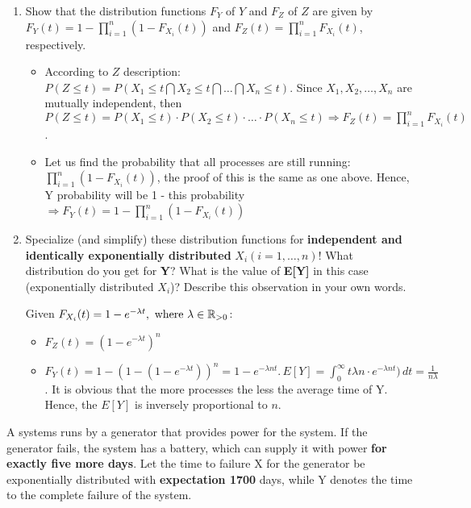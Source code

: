 \documentclass{homework}
\begin{document}
\begin{enumerate}[label=(\alph*)]
	\item Show that the distribution functions $F_Y$ of $Y$ and $F_Z$ of $Z$ are given by \newline $F_Y(t) = 1 - \prod_{i=1}^{n} (1 - F_{X_i}(t))$ and $F_Z(t) = \prod_{i=1}^{n} F_{X_i}(t)$, respectively.
	\begin{itemize}
		\item According to $Z$ description: $P(Z\leq t) = P(X_1\leq t \bigcap X_2\leq t \bigcap \dots \bigcap X_n\leq t)$. Since $X_1, X_2,\dots,X_n$ are mutually independent, then \newline $P(Z\leq t) = P(X_1\leq t)\cdot P(X_2\leq t) \cdot \dots \cdot P(X_n\leq t) \Rightarrow F_Z(t) = \prod_{i=1}^{n} F_{X_i}(t)$.
		\item Let us find the probability that all processes are still running: $\prod_{i=1}^{n} (1 - F_{X_i}(t))$, the proof of this is the same as one above. Hence, Y probability will be 1 - this probability $\Rightarrow F_Y(t) = 1 - \prod_{i=1}^{n} (1 - F_{X_i}(t))$
	\end{itemize}
	\item Specialize (and simplify) these distribution functions for \textbf{independent and identically exponentially distributed} $X_i (i=1,\dots,n)$!
What distribution do you get for \textbf{Y}? What is the value of \textbf{E[Y]} in this case (exponentially distributed $X_i$)? Describe this observation in your own words.

	Given $F_{X_i}(t) = 1 - e^{-\lambda t}, \text{ where } \lambda \in \mathbb R_{>0}$:
	\begin{itemize}
		\item $F_Z(t) = (1 - e^{-\lambda t})^n$
		\item $F_Y(t) = 1 - (1 - (1 - e^{-\lambda t}))^n = 1 - e^{-\lambda n t}.\, E[Y] = \int_0^\infty t\lambda n\cdot e^{-\lambda n t})\,dt = \frac{1}{n\lambda}$.
			\newline It is obvious that the more processes the less the average time of Y. Hence, the $E[Y]$ is inversely proportional to $n$.
	\end{itemize}
\end{enumerate}
\exercise*
A systems runs by a generator that provides power for the system. If the generator fails, the system has a battery, which can supply it with power \textbf{for exactly five more days}. Let the time to failure X for the generator be exponentially distributed with \textbf{expectation 1700} days, while Y denotes the time to the complete failure of the system.
\end{document}
